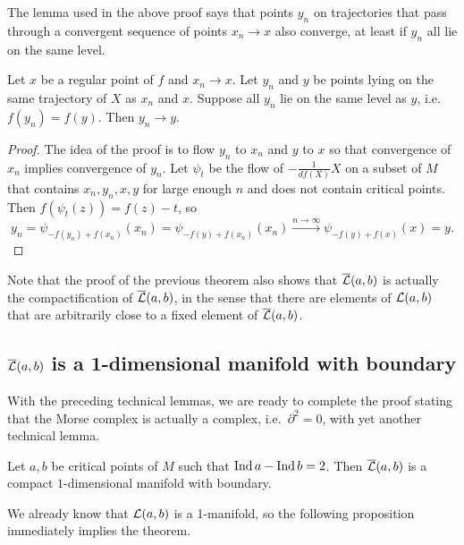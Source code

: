 The lemma used in the above proof says that points $y_n$ on trajectories that pass through a convergent sequence of points $x_n \to x$ also converge, at least if $y_n$ all lie on the same level.
\begin{marginfigure}
    \centering
    \caption{TODO lemma partial squared zero proof}
    \label{fig:lemma-partial-squared-zero-proof}
\end{marginfigure}
\begin{lemma}
    Let $x$ be a regular point of $f$ and $x_n \to x$.
    Let $y_n$ and  $y$ be points lying on the same trajectory of $X$ as  $x_n$ and  $x$.
    Suppose all $y_n$ lie on the same level as  $y$, i.e.  $f(y_n) = f(y)$.
    Then  $y_n \to  y$.
    \label{lemma:level-sets}
\end{lemma}
\begin{proof}
    The idea of the proof is to flow $y_n$ to  $x_n$ and $y$ to $x$ so that convergence of $x_n$ implies convergence of $y_n$.
    Let  $\psi_t$ be the flow of  $-\frac{1}{df (X)} X$ on a subset of $M$ that contains $x_n, y_n, x, y$ for large enough  $n$ and does not contain critical points.
    Then $f(\psi_t(z)) = f(z) - t$, so
     \[
         y_n = \psi_{-f(y_n) + f(x_n)}(x_n) = \psi_{-f(y) + f(x_n)}(x_n) \xrightarrow{n \to \infty}   \psi_{-f(y) + f(x)}(x) = y
    .\] 
\end{proof}

Note that the proof of the previous theorem also shows that $\overline{\mathcal L}(a, b) $ is actually the compactification of  $\overline{\mathcal L}(a, b)$, in the sense that there are elements of  $\mathcal L(a, b)$ that are arbitrarily close to a fixed element of $\overline{\mathcal L}(a, b)$.

\subsection{$\overline{\mathcal L}(a, b)$ is a 1-dimensional manifold with boundary}
With the preceding technical lemmas,
we are ready to complete the proof stating that the Morse complex is actually a complex, i.e.\ $\partial^2 = 0$, with yet another technical lemma.


\begin{theorem}
    Let $a, b$ be critical points of  $M$ such that  $\operatorname{Ind} a - \operatorname{Ind} b = 2$. Then  $\overline{\mathcal L}(a, b)$ is a compact  $1$-dimensional manifold with boundary.
\end{theorem}

We already know that $\mathcal L(a, b)$ is a 1-manifold, so the following proposition immediately implies the theorem.

